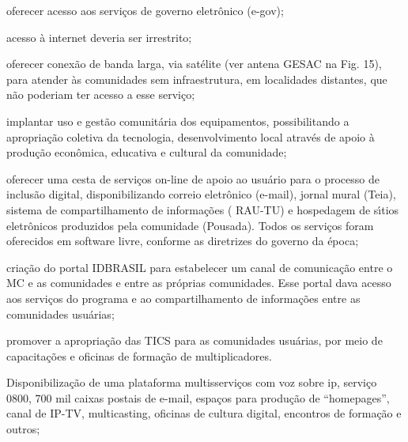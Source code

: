 \documentclass[
12pt,		%
openright,	%
twoside,  %
a4paper,			%
chapter=TITLE,		%
english,			%
french,				%
spanish,			%
brazil				%
]{USPSC-classe/USPSC}
\begin{document}
\begin{alineas}
\item oferecer acesso aos servi\c{c}os de governo eletr\^onico (e-gov);
\item acesso \`a internet deveria ser irrestrito;
\item oferecer conex\~ao de banda larga, via sat\'elite (ver antena GESAC na Fig. 15), para atender \`as comunidades sem infraestrutura,  em localidades distantes, que n\~ao poderiam ter acesso a esse servi\c{c}o;
\item implantar uso e gest\~ao comunit\'aria dos equipamentos, possibilitando a apropria\c{c}\~ao coletiva  da tecnologia,  desenvolvimento local atrav\'es de apoio \`a produ\c{c}\~ao econ\^omica, educativa e cultural da comunidade;
\item oferecer uma cesta de servi\c{c}os on-line de apoio ao usu\'ario para o processo de inclus\~ao digital, disponibilizando correio eletr\^onico (e-mail),  jornal mural (Teia), sistema de compartilhamento de informa\c{c}\~oes ( RAU-TU) e hospedagem de s\'{\i}tios eletr\^onicos produzidos pela comunidade (Pousada). Todos os servi\c{c}os  foram oferecidos em software livre, conforme as diretrizes do governo da \'epoca;
\item cria\c{c}\~ao do portal IDBRASIL para estabelecer um canal de comunica\c{c}\~ao entre o MC e as comunidades e entre as pr\'oprias comunidades. Esse portal dava acesso aos servi\c{c}os do programa e ao compartilhamento  de informa\c{c}\~oes  entre as comunidades usu\'arias;
\item promover a apropria\c{c}\~ao das TICS  para as comunidades usu\'arias, por meio de  capacita\c{c}\~oes e oficinas de forma\c{c}\~ao de multiplicadores.
\item Disponibiliza\c{c}\~ao de uma plataforma multisservi\c{c}os com voz sobre ip, servi\c{c}o 0800, 700 mil caixas postais de e-mail, espa\c{c}os para produ\c{c}\~ao de “homepages”, canal de IP-TV, multicasting, oficinas de cultura digital, encontros de forma\c{c}\~ao e outros;
\end{alineas}
\end{document}
